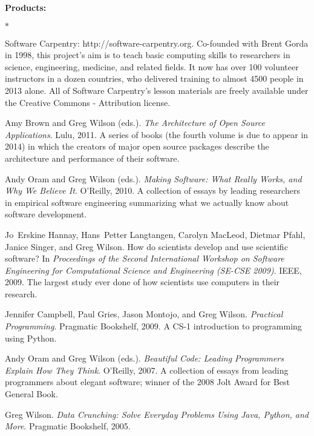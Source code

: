 \documentclass{proposalnsf}
\newlength{\up}
\begin{document}
\textbf{Products:} 

\vspace{\up}
\begin{list}{$\ast$}{\setlength{\leftmargin}{1em}}

\item
Software Carpentry: http://software-carpentry.org.
Co-founded with Brent Gorda in 1998,
this project's aim is to teach basic computing skills to researchers in science, engineering, medicine, and related fields.
It now has over 100 volunteer instructors in a dozen countries,
who delivered training to almost 4500 people in 2013 alone.
All of Software Carpentry's lesson materials are freely available under the Creative Commons - Attribution license.

\item
Amy Brown and Greg Wilson (eds.).
\emph{The Architecture of Open Source Applications}.
Lulu, 2011.
A series of books (the fourth volume is due to appear in 2014)
in which the creators of major open source packages describe the architecture and performance of their software.

\item
Andy Oram and Greg Wilson (eds.).
\emph{Making Software: What Really Works, and Why We Believe It}.
O'Reilly, 2010.
A collection of essays by leading researchers in empirical software engineering
summarizing what we actually know about software development.

\item
Jo~Erskine Hannay, Hans~Petter Langtangen, Carolyn MacLeod, Dietmar Pfahl, Janice Singer, and Greg Wilson.
How do scientists develop and use scientific software?
In \emph{Proceedings of the Second International Workshop on Software Engineering for Computational Science and Engineering (SE-CSE 2009)}. IEEE, 2009.
The largest study ever done of how scientists use computers in their research.

\item
Jennifer Campbell, Paul Gries, Jason Montojo, and Greg Wilson.
\emph{Practical Programming}.
Pragmatic Bookshelf, 2009.
A CS-1 introduction to programming using Python.

\item
Andy Oram and Greg Wilson (eds.).
\emph{Beautiful Code: Leading Programmers Explain How They Think}.
O'Reilly, 2007.
A collection of essays from leading programmers about elegant software;
winner of the 2008 Jolt Award for Best General Book.

\item
Greg Wilson.
\emph{Data Crunching: Solve Everyday Problems Using Java, Python, and More}.
Pragmatic Bookshelf, 2005.

\end{list}
\end{document}
